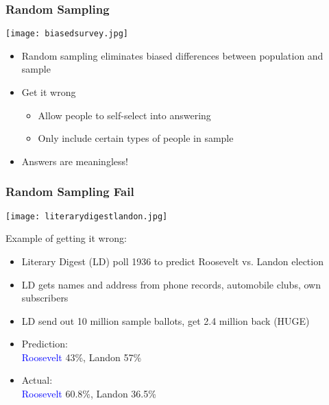 \documentclass{beamer}
\newcommand{\blue}{\textcolor{blue}}
\begin{document}
\begin{frame}
 \frametitle{Random Sampling}
 \begin{minipage}{.48\linewidth}
 \texttt{[image: biasedsurvey.jpg]}
 \end{minipage}\hfill
 \begin{minipage}{.48\linewidth}
 \begin{itemize}[<+->]
   \item Random sampling eliminates \alert{biased differences} between population and sample
   \item Get it wrong
      \begin{itemize}
        \item Allow people to self-select into answering
        \item Only include certain types of people in sample
      \end{itemize}
   \item Answers are meaningless!
 \end{itemize}
 \end{minipage}
\end{frame}

\begin{frame}
 \frametitle{Random Sampling Fail}
 \begin{minipage}{.38\linewidth}
 \texttt{[image: literarydigestlandon.jpg]}
 \end{minipage}\hfill
 \begin{minipage}{.58\linewidth}
 Example of getting it wrong:
 \begin{itemize}[<+->]
   \item Literary Digest (LD) poll 1936 to predict Roosevelt vs. Landon election
   \item LD gets names and address from phone records, automobile clubs, own subscribers
   \item LD send out 10 million sample ballots, get 2.4 million back (HUGE)
   \item Prediction:\\ \blue{Roosevelt} 43\%, \alert{Landon} 57\%
   \item Actual:\\  \blue{Roosevelt} 60.8\%, \alert{Landon} 36.5\%
 \end{itemize}
 \end{minipage}
\end{frame}
\end{document}
